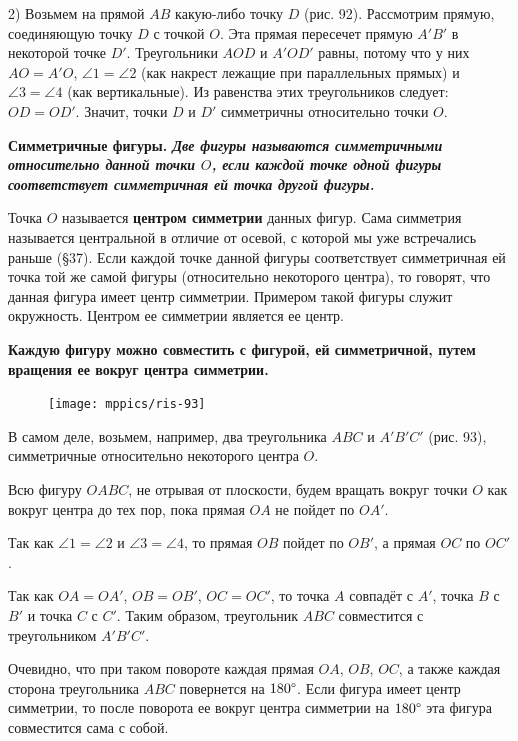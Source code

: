 \documentclass[oneside]{book}
\begin{document}
2) Возьмем на прямой $AB$ какую-либо точку $D$ (рис. 92).
Рассмотрим прямую, соединяющую точку $D$ с точкой $O$.
Эта прямая пересечет прямую $A'B'$ в некоторой точке $D'$.
Треугольники $AOD$ и $A'OD'$ равны, потому что у них $AO=A'O$, $\angle 1 = \angle 2$ (как накрест лежащие при параллельных прямых) и $\angle 3 = \angle 4$ (как вертикальные).
Из равенства этих треугольников следует:
$OD = OD'$.
Значит, точки $D$ и $D'$ симметричны относительно точки $O$.

\textbf{Симметричные фигуры.
\emph{Две фигуры называются симметричными относительно данной точки $O$, если каждой точке одной фигуры соответствует симметричная ей точка другой фигуры.}}

Точка $O$ называется \textbf{центром симметрии} данных фигур.
Сама симметрия называется центральной в отличие от осевой, с которой мы уже встречались раньше (§37).
Если каждой точке данной фигуры соответствует симметричная ей точка той же самой фигуры (относительно некоторого центра), то говорят, что данная фигура имеет центр симметрии.
Примером такой фигуры служит окружность.
Центром ее симметрии является ее центр.

\textbf{Каждую фигуру можно совместить с фигурой, ей симметричной, путем вращения ее вокруг центра симметрии.}

\begin{figure}
\centering
\texttt{[image: mppics/ris-93]}
\caption{}
\end{figure}

В самом деле, возьмем, например, два треугольника $ABC$ и $A'B'C'$ (рис. 93), симметричные относительно некоторого центра $O$.

Всю фигуру $OABC$, не отрывая от плоскости, будем вращать вокруг точки $O$ как вокруг центра до тех пор, пока прямая $OA$ не пойдет по $OA'$.

Так как $\angle 1 = \angle 2$ и $\angle 3 = \angle 4$, то прямая $OB$ пойдет по $OB'$, а прямая $OC$ по $OC'$.

Так как $OA = OA'$, $OB=OB'$, $OC=OC'$, то точка $A$ совпадёт с $A'$, точка $B$ с $B'$ и точка $C$ с $C'$.
Таким образом, треугольник $ABC$ совместится с треугольником $A'B'C'$.

Очевидно, что при таком повороте каждая прямая $OA$, $OB$, $OC$, а также каждая сторона треугольника $ABC$ повернется на $180\degree$.
Если фигура имеет центр симметрии, то после поворота ее вокруг центра симметрии на $180\degree$ эта фигура совместится сама с собой.
\end{document}

